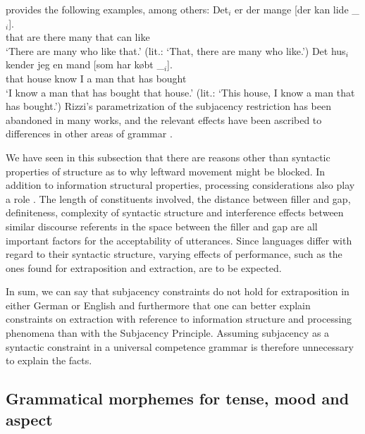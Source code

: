 \citet[]{Erteschik73a-u} provides the following examples, among others:
\eal
\label{Beispiel-Extraktion-Adjunkt}
\ex
\gll Det$_i$ er   der mange [der kan lide \_$_i$].\\
     that are there  many \hspaceThis{[}that can like\\
\glt `There are many who like that.' (lit.: `That, there are many who like.')
\ex
\gll Det    hus$_i$  kender jeg en    mand [som har købt \_$_i$].\\
     that   house  know  I a man \hspaceThis{[}that has bought\\
\glt `I know a man that has bought that house.' (lit.: `This house, I know a man that has bought.')
\zl
\noindent 
Rizzi's parametrization of the subjacency restriction has been abandoned in many works, and the relevant effects have been
ascribed to differences in other areas of grammar \citep{Adams84a,CMC83a,Grimshaw86b,Kluender92a}.

We have seen in this subsection that there are reasons other than syntactic properties of structure as to why leftward movement might be blocked.
In addition to information structural properties, processing considerations\label{Seite-Subjazenz-Performanz}
also play a role \citep*{Grosu73a,EC2000a,Gibson98a,KK93a,Hawkins99a,SHS2007a}.
The length of constituents involved, the distance between filler and gap, definiteness, complexity of syntactic structure and
interference effects between similar discourse referents in the space between the filler and gap are all important factors for
the acceptability of utterances. Since languages differ with regard to their syntactic structure,
varying effects of performance, such as the ones found for extraposition and extraction, are to be expected. 

In sum, we can say that subjacency constraints do not hold for extraposition in either German or English and furthermore that one can better
explain constraints on extraction with reference to information structure and processing phenomena than with the Subjacency Principle.
Assuming subjacency as a syntactic constraint in a universal competence grammar is therefore unnecessary to explain the facts.

\subsection{Grammatical morphemes for tense, mood and aspect}

